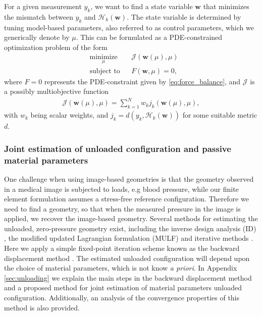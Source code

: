 For a given measurement $y_k$, we want to find a state variable
$\mathbf{w}$ that minimizes the mismatch between $y_k$ and
$\mathcal{H}_k(\mathbf{w})$. The state variable is determined by
tuning model-based parameters, also
referred to as control parameters, which we generically denote
by $\mu$. This can be formulated as a PDE-constrained optimization
problem of the form
\begin{equation}
  \begin{aligned}
    \label{eq:pde_opt}
    & \underset{\mu}{\text{minimize}}
    & &  \mathcal{J}(\mathbf{w}(\mu), \mu) \\
    & \text{subject to}
    & & F(\mathbf{w}, \mu)  = 0,
  \end{aligned}
\end{equation}
where $F=0$ represents the PDE-constraint given by
\eqref{eq:force_balance}, and $\mathcal{J}$ is a possibly
multiobjective function  
\begin{align}
  \mathcal{J}(\mathbf{w}(\mu), \mu) = \sum_{k = 1}^{N} w_k j_k (\mathbf{w}(\mu), \mu),
  \label{eq:cost_functional}
\end{align}
with $w_k$ being scalar weights, and $j_k = d( y_k,
  \mathcal{H}_k(\mathbf{w}) ) $ for some suitable metric $d$.



\subsubsection{Joint estimation of unloaded configuration and passive
  material parameters}
\label{sec:passive_param_estim}

One challenge when using image-based geometries is that the geometry
observed in a medical image is subjected to loads, e.g blood
pressure, while our finite element formulation assumes a stress-free
reference configuration. Therefore we need to find a geometry, so
that when the measured pressure in the image is applied, we recover
the image-based geometry. Several methods for estimating the unloaded,
zero-pressure geometry exist, including the inverse design analysis
(ID) \cite{govindjee1996computational}, the modified updated
Lagrangian formulation (MULF) \cite{gee2010computational} and
iterative methods \cite{bols2013computational,Rausch2017JB}.
Here we apply a simple fixed-point iteration scheme known as the backward
displacement method \cite{bols2013computational}.
The estimated unloaded configuration will depend upon the choice of material
parameters, which is not know  \emph{a priori}. In Appendix
\ref{sec:unloading} we explain the main steps in the backward
displacement method and a proposed method for joint estimation of material
parameters unloaded configuration. Additionally, an analysis of
the convergence properties of this method is also provided.


